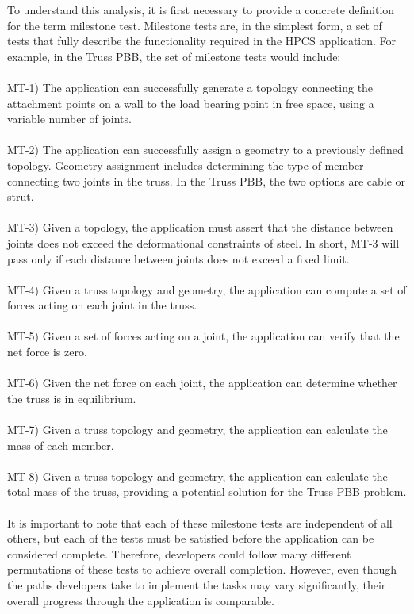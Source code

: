 \documentclass[11pt,twocolumn]{article}
\begin{document}
To understand this analysis, it is first necessary to provide a
concrete definition for the term milestone test.  Milestone tests are,
in the simplest form, a set of tests that fully describe the
functionality required in the HPCS application.  For example, in the
Truss PBB, the set of milestone tests would include: 
\\
\\
MT-1) The application can successfully generate a topology connecting
the attachment points on a wall to the load bearing point in free
space, using a variable number of joints.
\\
\\
MT-2) The application can successfully assign a geometry to a
previously defined topology.  Geometry assignment includes determining
the type of member connecting two joints in the truss.  In the Truss
PBB, the two options are cable or strut.
\\
\\
MT-3) Given a topology, the application must assert that the distance
between joints does not exceed the deformational constraints of steel.
In short, MT-3 will pass only if each distance between joints does not
exceed a fixed limit.
\\
\\
MT-4) Given a truss topology and geometry, the application can compute
a set of forces acting on each joint in the truss.
\\
\\
MT-5) Given a set of forces acting on a joint, the application can
verify that the net force is zero.
\\
\\
MT-6) Given the net force on each joint, the application can determine
whether the truss is in equilibrium.
\\
\\
MT-7) Given a truss topology and geometry, the application can
calculate the mass of each member.
\\
\\
MT-8) Given a truss topology and geometry, the application can
calculate the total mass of the truss, providing a potential solution
for the Truss PBB problem.
\\
\\
It is important to note that each of these milestone tests are
independent of all others, but each of the tests must be satisfied
before the application can be considered complete.  Therefore,
developers could follow many different permutations of these tests to
achieve overall completion.  However, even though the paths developers
take to implement the tasks may vary significantly, their overall
progress through the application is comparable.
\end{document}
